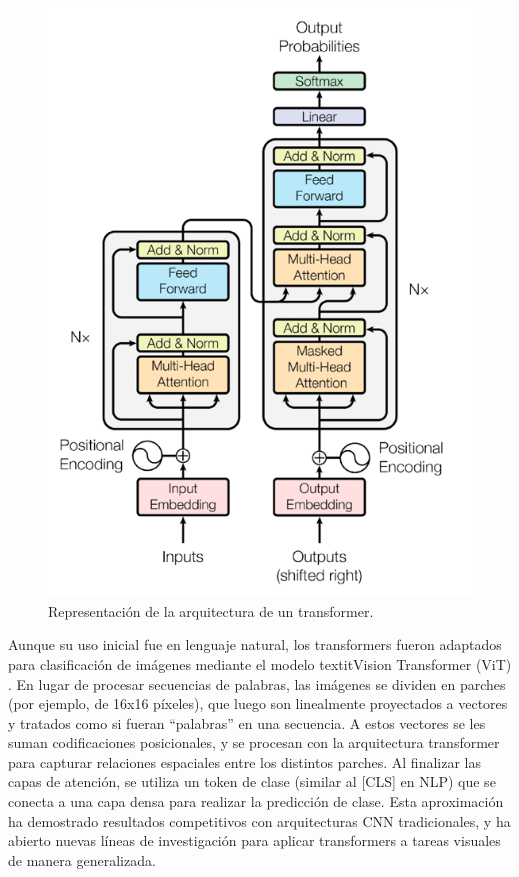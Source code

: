 \begin{figure}[h!] 
    \includegraphics[width=1\textwidth]{images/transformer.png} 
    \centering 
    \caption[Representación de la arquitectura de un transformer.]
    {Representación de la arquitectura de un transformer\protect \cite{vaswani2017attention}.}
    \label{Image:transformer} 
\end{figure}

Aunque su uso inicial fue en lenguaje natural, los 
transformers fueron adaptados para clasificación de imágenes 
mediante el modelo textit{Vision Transformer} (ViT) \cite{Dosovitskiy2020}. 
En lugar de procesar secuencias de palabras, las imágenes se dividen en 
parches (por ejemplo, de 16x16 píxeles), que luego son 
linealmente proyectados a vectores y tratados como si fueran 
``palabras'' en una secuencia. A estos vectores se les 
suman codificaciones posicionales, y se procesan con la 
arquitectura transformer para capturar relaciones espaciales 
entre los distintos parches. Al finalizar las capas de 
atención, se utiliza un token de clase (similar al [CLS] 
en NLP) que se conecta a una capa densa para realizar la 
predicción de clase. Esta aproximación ha demostrado 
resultados competitivos con arquitecturas CNN tradicionales, 
y ha abierto nuevas líneas de investigación para aplicar 
transformers a tareas visuales de manera generalizada.

